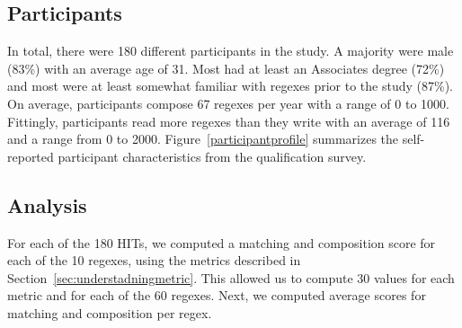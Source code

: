 \subsection{Participants}

In total, there were 180 different participants in the study.
A majority were male (83\%) with an average age of 31. Most had
at least an Associates degree (72\%) and most were at least somewhat familiar with regexes prior to the study (87\%). On average,
participants compose 67 regexes per year with a range of 0 to 1000. Fittingly, participants read more regexes than they write with an average of 116 and a range from 0 to 2000. Figure~\ref{participantprofile} summarizes the self-reported participant characteristics from the qualification survey.




\subsection{Analysis}
For each of the 180 HITs, we computed a matching and composition score for each of the 10 regexes, using the metrics described in Section~\ref{sec:understadningmetric}. This allowed us to compute 30 values for each metric and for each of the 60 regexes. Next, we computed average scores for matching and composition per regex. 

